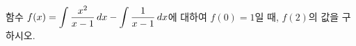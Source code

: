 함수 $f(x)=\displaystyle\int \dfrac{x^2}{x-1}\mkern3mu dx-\int \dfrac{1}{x-1}\mkern3mu dx$에 대하여 $f(0)=1$일 때, $f(2)$의 값을 구하시오.
